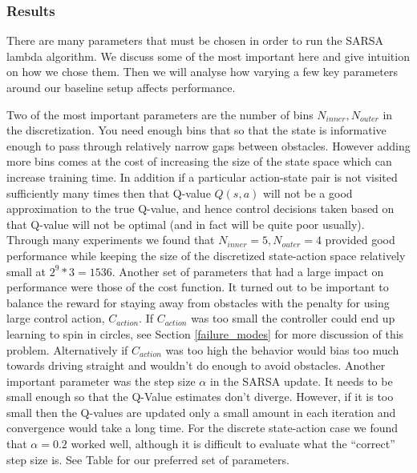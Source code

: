 \documentclass{article}
\begin{document}
\subsubsection{Results}

There are many parameters that must be chosen in order to run the SARSA lambda algorithm. We discuss some of the most important here and give intuition on how we chose them. Then we will analyse how varying a few key parameters around our baseline setup affects performance. 

Two of the most important parameters are the number of bins $N_{inner}, N_{outer}$ in the discretization. You need enough bins that so that the state is informative enough to pass through relatively narrow gaps between obstacles. However adding more bins comes at the cost of increasing the size of the state space which can increase training time. In addition if a particular action-state pair is not visited sufficiently many times then that Q-value $Q(s,a)$ will not be a good approximation to the true Q-value, and hence control decisions taken based on that Q-value will not be optimal (and in fact will be quite poor usually). Through many experiments we found that $N_{inner} = 5, N_{outer} = 4$ provided good performance while keeping the size of the discretized state-action space relatively small at $2^9 * 3 = 1536$. Another set of parameters that had a large impact on performance were those of the cost function. It turned out to be important to balance the reward for staying away from obstacles with the penalty for using large control action, $C_{action}$. If $C_{action}$ was too small the controller could end up learning to spin in circles, see Section \ref{failure_modes} for more discussion of this problem. Alternatively if $C_{action}$ was too high the behavior would bias too much towards driving straight and wouldn't do enough to avoid obstacles. Another important parameter was the step size $\alpha$ in the SARSA update. It needs to be small enough so that the Q-Value estimates don't diverge. However, if it is too small then the Q-values are updated only a small amount in each iteration and convergence would take a long time. For the discrete state-action case we found that $\alpha = 0.2$ worked well, although it is difficult to evaluate what the ``correct'' step size is. See Table  for our preferred set of parameters.
\end{document}

